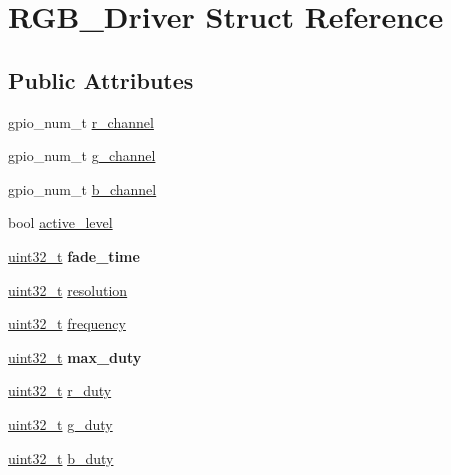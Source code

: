 \hypertarget{structRGB__Driver}{}\section{R\+G\+B\+\_\+\+Driver Struct Reference}
\label{structRGB__Driver}
\subsection*{Public Attributes}
\begin{DoxyCompactItemize}
\item 
gpio\+\_\+num\+\_\+t \hyperlink{structRGB__Driver_a899a4207afcd1b6b3dc55e9dbcc4b9ee}{r\+\_\+channel}
\item 
gpio\+\_\+num\+\_\+t \hyperlink{structRGB__Driver_a9c39550796d8bcd79beefdc4faac485f}{g\+\_\+channel}
\item 
gpio\+\_\+num\+\_\+t \hyperlink{structRGB__Driver_a2ce6a8d15b7a1411f68cd26c67e8cd4a}{b\+\_\+channel}
\item 
bool \hyperlink{structRGB__Driver_a37da49d052a49bd9e57357bdab8c0591}{active\+\_\+level}
\item 
\mbox{\label{structRGB__Driver_a8f868b5b0af48e661af85c30e6302a59}} 
\hyperlink{vl53l0x__types_8h_a435d1572bf3f880d55459d9805097f62}{uint32\+\_\+t} {\bfseries fade\+\_\+time}
\item 
\hyperlink{vl53l0x__types_8h_a435d1572bf3f880d55459d9805097f62}{uint32\+\_\+t} \hyperlink{structRGB__Driver_a2d794ede506e3bb49b2f3ae4c772c418}{resolution}
\item 
\hyperlink{vl53l0x__types_8h_a435d1572bf3f880d55459d9805097f62}{uint32\+\_\+t} \hyperlink{structRGB__Driver_a664e5a2dbe8b040241fa1296970df9a7}{frequency}
\item 
\mbox{\label{structRGB__Driver_a09a465ffbc633a5dcf33a586d3f97cd0}} 
\hyperlink{vl53l0x__types_8h_a435d1572bf3f880d55459d9805097f62}{uint32\+\_\+t} {\bfseries max\+\_\+duty}
\item 
\hyperlink{vl53l0x__types_8h_a435d1572bf3f880d55459d9805097f62}{uint32\+\_\+t} \hyperlink{structRGB__Driver_a66dea398a8883deef0901c71be75a980}{r\+\_\+duty}
\item 
\hyperlink{vl53l0x__types_8h_a435d1572bf3f880d55459d9805097f62}{uint32\+\_\+t} \hyperlink{structRGB__Driver_a0b3b1c3bfbc55af8155a6224a9d247a4}{g\+\_\+duty}
\item 
\hyperlink{vl53l0x__types_8h_a435d1572bf3f880d55459d9805097f62}{uint32\+\_\+t} \hyperlink{structRGB__Driver_ab0a18173b1c3080386c2a2439d04befd}{b\+\_\+duty}

\end{DoxyCompactItemize}
